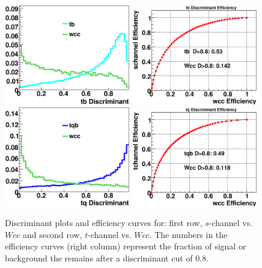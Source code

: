 \begin{figure}[!h!tbp]
\includegraphics[width=0.49\textwidth]
{eps/MatrixElement/performance/tb_Discriminant__schannel_wcc}
\includegraphics[width=0.49\textwidth]
{eps/MatrixElement/performance/tb_Efficiency__schannel_wcc}
\includegraphics[width=0.49\textwidth]
{eps/MatrixElement/performance/tq_Discriminant__tchannel_wcc}
\includegraphics[width=0.49\textwidth]
{eps/MatrixElement/performance/tq_Efficiency__tchannel_wcc}
\caption{Discriminant plots and efficiency curves for:
first row, $s$-channel vs. $Wcc$ and second row, $t$-channel
vs. $Wcc$. The numbers in the
efficiency curves (right column) represent the fraction of signal or
background the remains after a discriminant cut of 0.8.}
\label{disc_wcc}
\end{figure}

